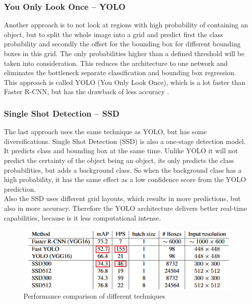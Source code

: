 \subsubsection{You Only Look Once -- YOLO}

Another approach is to not look at regions with high probability of containing an object, but to split the whole image into a grid and predict first the class probability and secondly the offset for the bounding box for different bounding boxes in this grid. The only probabilities higher than a defined threshold will be taken into consideration. This reduces the architecture to one network and eliminates the bottleneck separate classification and bounding box regression. This approach is called YOLO (You Only Look Once), which is a lot faster than Faster R-CNN, but has the drawback of less accuracy \cite{tim3}.

\subsubsection{Single Shot Detection -- SSD}

The last approach uses the same technique as YOLO, but has some diversifications. Single Shot Detection (SSD) is also a one-stage detection model. It predicts class and bounding box at the same time. Unlike YOLO it will not predict the certainty of the object being an object, its only predicts the class probabilities, but adds a background class. So when the background class has a high probability, it has the same effect as a low confidence score from the YOLO prediction.\\

Also the SSD uses different grid layouts, which results in more predictions, but also in more accuracy. Therefore the YOLO architecture delivers better real-time capabilities, because is it less computational intense.

\begin{figure}[H]
\centering
\includegraphics{sources/tempsnip.png}
\caption[Performance comparison of different techniques]{Performance comparison of different techniques \cite{tim5}}
\label{fig:depthwise_convolution}
\end{figure}


